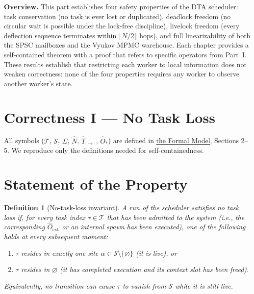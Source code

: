 \documentclass[11pt,a4paper]{article}
\newtheorem{definition}{Definition}[section]
\newcommand{\Num}{\hat{N}}
\newcommand{\Trf}[2]{\hat{T}_{#1 \to #2}}
\begin{document}
\bigskip
\noindent\textbf{Overview.}
This part establishes four safety properties of the DTA scheduler:
task conservation (no task is ever lost or duplicated),
deadlock freedom (no circular wait is possible under the lock-free discipline),
livelock freedom (every deflection sequence terminates within $\lfloor N/2\rfloor$ hops),
and full linearizability of both the SPSC mailboxes and the Vyukov MPMC
warehouse.  Each chapter provides a self-contained theorem with a proof
that refers to specific operators from Part~I.  These results establish
that restricting each worker to local information does not weaken
correctness: none of the four properties requires any worker to observe
another worker's state.



\section*{Correctness I --- No Task Loss}
\label{chap:no_task_loss}
\setcounter{section}{0}

All symbols ($\mathcal{T}$, $\mathcal{S}$, $\Sigma$, $\Num$,
$\Trf{\cdot}{\cdot}$, $\hat{O}_*$) are defined in
\hyperref[chap:formal_model]{the Formal Model}, Sections 2--5.  We reproduce only
the definitions needed for self-containedness.

\bigskip

\section{Statement of the Property}

\begin{definition}[No-task-loss invariant]
\label{def:ntl}
A run of the scheduler satisfies \emph{no task loss} if, for every
task index $\tau \in \mathcal{T}$ that has been admitted to the system
(i.e., the corresponding $\hat{O}_{\text{ext}}$ or an internal spawn
has been executed), one of the following holds at every subsequent
moment:
\begin{enumerate}
  \item $\tau$ resides in exactly one site
        $\alpha \in \mathcal{S} \setminus \{\varnothing\}$ (it is live), or
  \item $\tau$ resides in $\varnothing$ (it has completed execution and
        its context slot has been freed).
\end{enumerate}
Equivalently, no transition can cause $\tau$ to vanish from
$\mathcal{S}$ while it is still live.
\end{definition}
\end{document}
